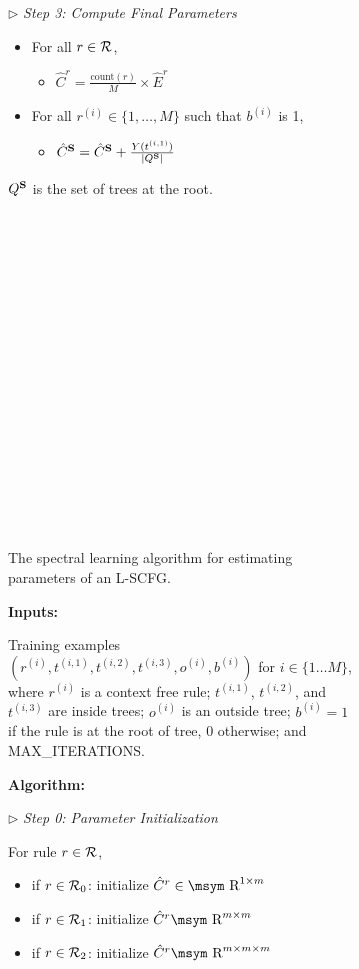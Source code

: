 \documentclass[11pt]{article}
\newcommand{\rione}{r^{(i)}}
\newcommand{\xione}{t^{(i,1)}}
\newcommand{\xitwo}{t^{(i,2)}}
\newcommand{\xithree}{t^{(i,3)}}
\newcommand{\oi}{o^{(i)}}
\newcommand{\rules}{{\cal R}}
\newcommand{\srule}{{X \rightarrow b, c}}
\newcommand{\e}[1]{\hat{#1}}
\newcommand{\bS}{{\bf S}}
\newcommand{\reals}{\mbox{\msym R}}
\begin{document}
\begin{figure}[t!]
{\begin{footnotesize}
\begin{subfigure}{0.87\columnwidth}
	$\triangleright$ \emph{Step 3: Compute Final Parameters}
	\begin{itemize}
		\item For all $r \in \rules$, 
			\begin{itemize}[label={}]
				\item $\e{C}^r = \frac{\textrm{count}(r)}{M} \times \e{E}^r$
			\end{itemize}
		\item For all $\rione \in \{1, \dots, M\}$ such that $b^{(i)}$ is 1, 
		\begin{itemize}[label={}]
			\item $\e{C}^\bS =  \e{C}^\bS + \frac{Y(\xione)}{|Q^\bS|} $
		\end{itemize}						
	\end{itemize}
	$Q^\bS$ is the set of trees at the root.  

$\,$

$\,$

$\,$

$\,$

$\,$

$\,$

$\,$

$\,$

$\,$

$\,$
	\caption{\small The spectral learning algorithm for estimating parameters of an L-SCFG.}
	\label{fig:splearn}
	\end{subfigure}
	\begin{subfigure}{1.05\columnwidth}
	{\bf Inputs:} 
	
	Training examples $(\rione, \xione, \xitwo, \xithree, \oi, b^{(i)})$ for $i \in \{1 \ldots M\}$, where $\rione$ is a context free rule; $\xione$, $\xitwo$, and $\xithree$ are inside trees; $\oi$ is an outside tree; $b^{(i)} = 1$ if the rule is at the root of tree, $0$ otherwise; and MAX\_ITERATIONS.

	{\bf Algorithm:}

	$\triangleright$ \emph{Step 0: Parameter Initialization}
	
	For rule $r \in \rules$,
	\begin{itemize}[noitemsep]
		\item if $r \in \rules_0$: initialize $\e{C}^r \in \reals^{1 \times m}$ 
		\item if $r \in \rules_1$: initialize $\e{C}^r \reals^{m \times m}$ 
		\item if $r \in \rules_2$: initialize $\e{C}^r \reals^{m \times m \times m}$ 
	\end{itemize}
	

\end{subfigure}
\end{footnotesize}}
\end{figure}
\end{document}
